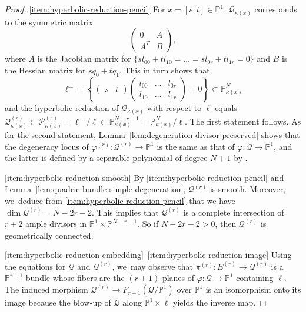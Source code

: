 \documentclass[10pt,a4paper]{amsart}
\providecommand{\skpt}{\par\medskip}
\theoremstyle{plain}
\theoremstyle{definition}
\let\phi\varphi
\renewcommand\P{\mathbb{P}}
\begin{document}
\skpt
\begin{proof}
\eqref{item:hyperbolic-reduction-pencil}
For $x =[s:t]\in \P^1$, $\mathcal{Q}_{\kappa(x)}$ corresponds to the symmetric matrix
\[
\begin{pmatrix}
0 & A\\
A^T & B
\end{pmatrix},
\]
where $A$ is the Jacobian matrix for $\{s l_{00} + t l_{10} = \dots = s l_{0r} + t l_{1r} = 0\}$ and $B$ is the Hessian matrix for $s q_0 + t q_1$.
This in turn shows that
\[
\ell^{\perp}=
\left\{
\begin{pmatrix}
s & t
\end{pmatrix}
\begin{pmatrix}
l_{00} & \dots &l_{0r}\\
l_{10} & \dots & l_{1r}
\end{pmatrix}
=0
\right\}
\subset \P^{N}_{\kappa(x)}
\]
and the hyperbolic reduction of $\mathcal{Q}_{\kappa(x)}$ with respect to $\ell$ equals $\mathcal{Q}^{(r)}_{\kappa(x)} \subset \mathcal{P}^{(r)}_{\kappa(x)}=\ell^\perp/\ell \subset \P^{N-r-1}_{\kappa(x)}=\P^{N}_{\kappa(x)}/\ell$.
The first statement follows.
As for the second statement, Lemma~\ref{lem:degeneration-divisor-preserved} shows that the degeneracy locus of $\phi^{(r)}\colon \mathcal{Q}^{(r)}\to \P^1$ is the same as that of $\phi\colon \mathcal{Q}\to \P^1$, and the latter is defined by a separable polynomial of degree $N+1$ by \cite[Prop.\,2.1]{Reid-thesis}.

\eqref{item:hyperbolic-reduction-smooth}
By \eqref{item:hyperbolic-reduction-pencil} and Lemma~\ref{lem:quadric-bundle-simple-degeneration},
$\mathcal{Q}^{(r)}$ is smooth.
Moreover, we~deduce from \eqref{item:hyperbolic-reduction-pencil} that we have $\dim \mathcal{Q}^{(r)}=N-2r-2$.
This implies that $\mathcal{Q}^{(r)}$ is a complete intersection of $r+2$ ample divisors in $\P^1\times \P^{N-r-1}$.
So if $N-2r-2>0$, then $\mathcal{Q}^{(r)}$ is geometrically connected.

\eqref{item:hyperbolic-reduction-embedding}--\eqref{item:hyperbolic-reduction-image}
Using the equations for $\mathcal{Q}$ and $\mathcal{Q}^{(r)}$, we~may observe that
$\pi^{(r)}\colon E^{(r)}\to \mathcal{Q}^{(r)}$ is a $\P^{r+1}$-bundle
whose fibers are
the $(r+1)$-planes of $\phi\colon \mathcal{Q}\to \P^1$
containing $\ell$.
The induced morphism $\mathcal{Q}^{(r)}\to F_{r+1}(\mathcal{Q}/\P^1)$ over $\P^1$ is an isomorphism onto its image
because the blow-up of $\mathcal{Q}$ along $\P^1\times \ell$
yields the inverse map.


\end{proof}
\end{document}
